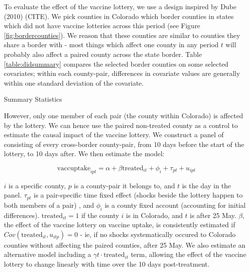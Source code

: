 \documentclass[12pt]{article}
\begin{document}
\begin{spacing}{1.5}
		To evaluate the effect of the vaccine lottery, we use a design inspired by Dube (2010) (CITE). We pick counties in Colorado which border counties in states which did not have vaccine lotteries across this period (see Figure \ref{fig:bordercounties}). We reason that these counties are similar to counties they share a border with - most things which affect one county in any period $t$ will probably also affect a paired county across the state border. Table \ref{table:didsummary} compares the selected border counties on some selected covariates; within each county-pair, differences in covariate values are generally within one standard deviation of the covariate.
		
		\begin{table}
			\centering
			\caption{Summary Statistics}
			\centerline{}
			\label{table:didsummary}
		\end{table}
		
		However, only one member of each pair (the county within Colorado) is affected by the lottery. We can hence use the paired non-treated county as a control to estimate the causal impact of the vaccine lottery. We construct a panel of consisting of every cross-border county-pair, from 10 days before the start of the lottery, to 10 days after. We then estimate the model:
		
		\begin{equation} \label{eq:pairdesign}
			\textrm{vaccuptake}_{ipt} = \alpha + \beta \textrm{treated}_{it} + \phi_i + \tau_{pt} + u_{ipt}
		\end{equation}
		
		$i$ is a specific county, $p$ is a county-pair it belongs to, and $t$ is the day in the panel. $\tau_{pt}$ is a pair-specific time fixed effect (shocks beside the lottery happen to both members of a pair) , and $\phi_i$ is a county fixed account (accounting for initial differences). $\textrm{treated}_{it}=1$ if the county $i$ is in Colorado, and $t$ is after 25 May. $\beta$, the effect of the vaccine lottery on vaccine uptake, is consistently estimated if $Cov(\textrm{treated}_{it}, u_{itp})=0$ - ie, if no shocks systematically occured to Colorado counties without affecting the paired counties, after 25 May. We also estimate an alternative model including a $\gamma t\cdot\textrm{treated}_{it}$ term, allowing the effect of the vaccine lottery to change linearly with time over the 10 days post-treatment.
		

\end{spacing}
\end{document}
